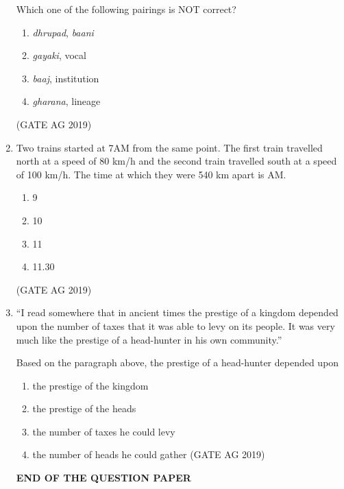 \documentclass[journal,12pt,onecolumn]{IEEEtran}
\theoremstyle{remark}
\begin{document}
\begin{enumerate}
Which one of the following pairings is NOT correct?


\begin{enumerate}
    \item \textit{dhrupad}, \textit{baani}
    \item \textit{gayaki}, vocal
    \item \textit{baaj}, institution
    \item \textit{gharana}, lineage
\end{enumerate}
\hfill{(GATE AG 2019)}

\item Two trains started at 7AM from the same point. The first train travelled north at a speed of 80 km/h and the second train travelled south at a speed of 100 km/h. The time at which they were 540 km apart is \underline{\hspace{2cm}} AM.
\begin{enumerate}
    \item 9
    \item 10
    \item 11
    \item 11.30
\end{enumerate}
\hfill{(GATE AG 2019)}


\item ``I read somewhere that in ancient times the prestige of a kingdom depended upon the number of taxes that it was able to levy on its people. It was very much like the prestige of a head-hunter in his own community.''


 
 Based on the paragraph above, the prestige of a head-hunter depended upon \underline{\hspace{2cm}}



\begin{enumerate}
    \item the prestige of the kingdom
    \item the prestige of the heads
    \item the number of taxes he could levy
    \item the number of heads he could gather
    \hfill{(GATE AG 2019)}
\end{enumerate}



\begin{center}
\textbf{END OF THE QUESTION PAPER}
\end{center}
\end{enumerate}   
\end{document}
